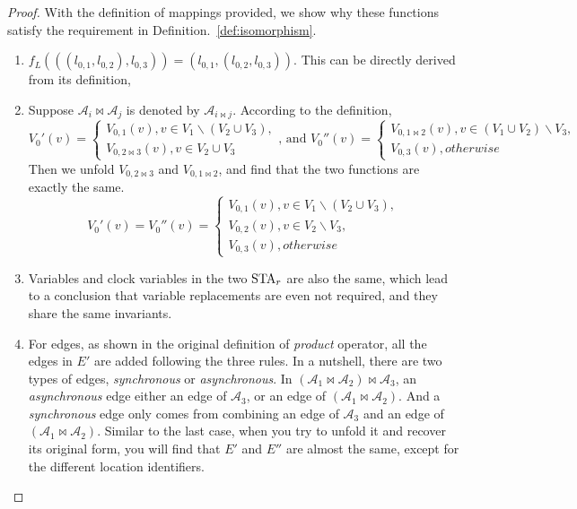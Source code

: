 \begin{proof}
With the definition of mappings provided, we show why these functions satisfy the requirement in Definition.~\ref{def:isomorphism}.

\begin{enumerate}
    \item $f_L(((l_{0,1}, l_{0,2}), l_{0,3})) = (l_{0,1}, (l_{0,2}, l_{0,3}))$. This can be directly derived from its definition,
    \item Suppose $\mathscr{A}_i\bowtie\mathscr{A}_j$ is denoted by $\mathscr{A}_{i\bowtie j}$. According to the definition,
        \begin{displaymath}
            V_0'(v)=
            \left\{
                \begin{array}{lr}
                    V_{0,1}(v), v\in V_1\backslash(V_2\cup V_3), \\
                    V_{0,2\bowtie 3}(v), v\in V_2\cup V_3
                \end{array}
            \right.
            \mbox{, and }
            V_0''(v)=
            \left\{
                \begin{array}{lr}
                    V_{0,1\bowtie 2}(v), v\in (V_1\cup V_2)\backslash V_3, \\
                    V_{0,3}(v), otherwise
                \end{array}
            \right.
        \end{displaymath}
        Then we unfold $V_{0,2\bowtie 3}$ and $V_{0,1\bowtie 2}$, and find that the two functions are exactly the same.
        \begin{displaymath}
            V_0'(v)=
            V_0''(v)=
            \left\{
                \begin{array}{lr}
                    V_{0,1}(v), v\in V_1\backslash (V_2\cup V_3), \\
                    V_{0,2}(v), v\in V_2\backslash V_3, \\
                    V_{0,3}(v), otherwise
                \end{array}
            \right.
        \end{displaymath}
    \item Variables and clock variables in the two $\mbox{STA}_r$ are also the same, which lead to a conclusion that variable replacements are even not required, and they share the same invariants. 
    \item For edges, as shown in the original definition of \emph{product} operator, all the edges in $E'$ are added following the three rules. In a nutshell, there are two types of edges, \emph{synchronous} or \emph{asynchronous}. In $(\mathscr{A}_{1}\bowtie \mathscr{A}_{2})\bowtie \mathscr{A}_{3}$, an \emph{asynchronous} edge either an edge of $\mathscr{A}_{3}$, or an edge of $(\mathscr{A}_{1}\bowtie \mathscr{A}_{2})$. And a \emph{synchronous} edge only comes from combining an edge of $\mathscr{A}_{3}$ and an edge of $(\mathscr{A}_{1}\bowtie \mathscr{A}_{2})$. Similar to the last case, when you try to unfold it and recover its original form, you will find that $E'$ and $E''$ are almost the same, except for the different location identifiers.
\end{enumerate}
\end{proof}

